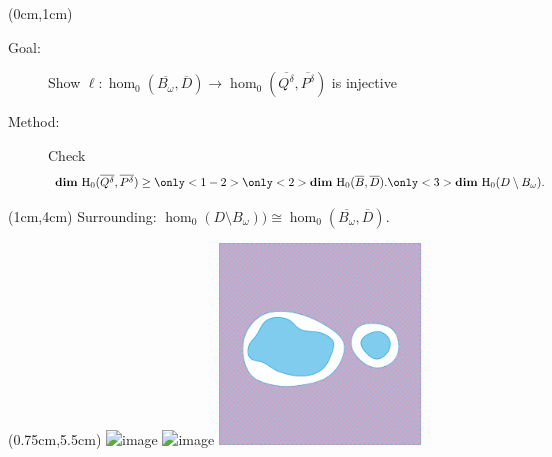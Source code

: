 \begin{frame}
  \begin{textblock*}{12cm}(0cm,1cm)
    \begin{small}
    \begin{description}
      \item[Goal:] Show $\ell : \hom_0(\overline{B_\omega}, \overline{D})\to \hom_0(\overline{Q^\delta},\overline{P^\delta})$ is injective
      \item[Method:] Check \[%
        \mathbf{dim}~\hom_0(\overline{Q^\delta},\overline{P^\delta})\geq%
        \only<1-2>{{\only<2>{\color{red}}\mathbf{dim}~\hom_0(\overline{B}, \overline{D}).}}%
        \only<3>{\mathbf{dim}~\hom_0(D\setminus B_\omega).}\]
    \end{description}
    \end{small}
  \end{textblock*}

  \begin{textblock*}{11cm}(1cm,4cm)
    {\color{red} Surrounding:} $\hom_0(D\setminus B_\omega))\cong\hom_0(\overline{B_\omega}, \overline{D}).$
  \end{textblock*}


  \begin{textblock*}{12cm}(0.75cm,5.5cm)
    \includegraphics<1-2>[trim=50 250 50 300, clip, width=0.4\textwidth]{figures/comp/DBcomp}%
    \includegraphics<3>[trim=50 250 50 300, clip, width=0.4\textwidth]{figures/comp/Bint}\hspace{6ex}%
    \includegraphics[trim=50 250 50 300, clip, width=0.4\textwidth]{figures/comp/PQcomp}
  \end{textblock*}
\end{frame}

